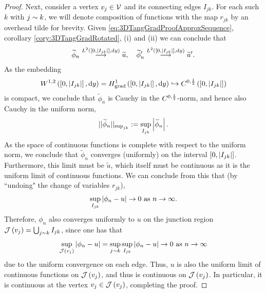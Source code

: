 \begin{proof}
	Next, consider a vertex $v_j\in\mathcal{V}$ and its connecting edges $I_{jk}$.
	For each such $k$ with $j\sim k$, we will denote composition of functions with the map $r_{jk}$ by an overhead tilde for brevity.
	Given \eqref{eq:3DTangGradProofApproxSequence}, corollary \ref{cory:3DTangGradRotated}, (i) and (ii) we can conclude that
	\begin{align*}
		\widetilde{\phi}_n \overset{L^{2}\left( \left[ 0,\left\lvert I_{jk} \right\rvert \right],\mathrm{d} y \right)}{\longrightarrow} \widetilde{u},
		\quad
		\widetilde{\phi}_n' \overset{L^{2}\left( \left[ 0,\left\lvert I_{jk} \right\rvert \right],\mathrm{d} y \right)}{\longrightarrow} \widetilde{u}'.
	\end{align*}
	As the embedding
	\begin{align*}
		W^{1,2}\left( \left[ 0,\left\lvert I_{jk} \right\rvert \right],\mathrm{d} y \right) = H^1_\mathrm{grad}\left( \left[ 0,\left\lvert I_{jk} \right\rvert \right], \mathrm{d}y \right) \hookrightarrow C^{0,\frac{1}{2}}\left( \left[ 0,\left\lvert I_{jk} \right\rvert \right] \right)
	\end{align*}
	is compact, we conclude that $\widetilde{\phi}_n$ is Cauchy in the $C^{0,\frac{1}{2}}$-norm, and hence also Cauchy in the uniform norm,
	\begin{align*}
		\lvert\lvert \widetilde{\phi}_n \rvert\rvert_{\sup_{jk}} := \sup_{I_{jk}}\left\lvert \widetilde{\phi}_n \right\rvert.
	\end{align*}
	As the space of continuous functions is complete with respect to the uniform norm, we conclude that $\widetilde{\phi}_n$ converges (uniformly) on the interval $\left[ 0,\left\lvert I_{jk} \right\rvert \right]$.
	Furthermore, this limit must be $\widetilde{u}$, which itself must be continuous as it is the uniform limit of continuous functions.
	We can conclude from this that (by ``undoing" the change of variables $r_{jk}$),
	\begin{align*}
		\sup_{I_{jk}}\left\lvert \phi_n - u \right\rvert \rightarrow 0 \ \text{as} \ n \rightarrow\infty.
	\end{align*}
	Therefore, $\phi_n$ also converges uniformly to $u$ on the junction region $\mathcal{J}\left( v_j \right) = \bigcup_{j\sim k}I_{jk}$, since one has that
	\begin{align*}
		\sup_{\mathcal{J}\left( v_j \right)}\left\lvert \phi_n - u \right\rvert = \sup_{j\sim k}\sup_{I_{jk}}\left\lvert \phi_n - u \right\rvert \rightarrow 0 \ \text{as} \ n \rightarrow\infty
	\end{align*}
	due to the uniform convergence on each edge.
	Thus, $u$ is also the uniform limit of continuous functions on $\mathcal{J}\left( v_j \right)$, and thus is continuous on $\mathcal{J}\left( v_j \right)$.
	In particular, it is continuous at the vertex $v_j\in \mathcal{J}\left( v_j \right)$, completing the proof.
\end{proof}

